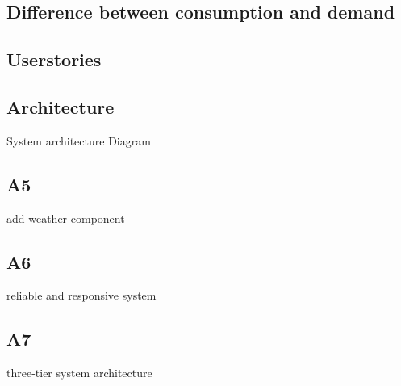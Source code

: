 \documentclass[12pt]{scrartcl}
\begin{document}
\subsection{Difference between consumption and demand}\label{sec:diffconsumptiondemand}



\subsection{Userstories}\label{sec:userstories}


\subsection{Architecture}
System architecture Diagram

\subsection*{A5}
add weather component

\subsection*{A6}
reliable and responsive system

\subsection*{A7}
three-tier system architecture

\end{document}
